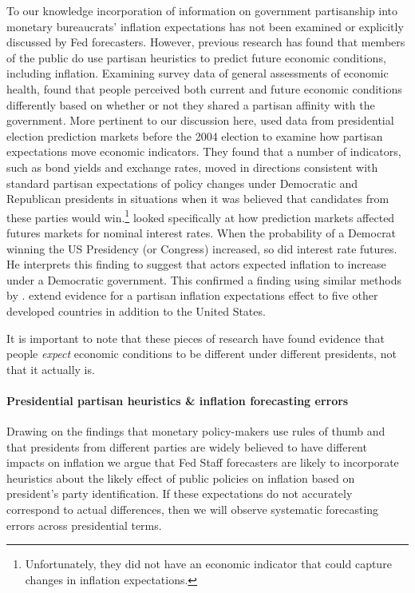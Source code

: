 \documentclass[a4paper]{article}\usepackage[]{graphicx}\usepackage[]{color}
\begin{document}
To our knowledge incorporation of information on government partisanship into monetary bureaucrats' inflation expectations has not been examined or explicitly discussed by Fed forecasters. However, previous research has found that members of the public do use partisan heuristics to predict future economic conditions, including inflation. Examining survey data of general assessments of economic health, \cite{Duch2000} found that people perceived both current and future economic conditions differently based on whether or not they shared a partisan affinity with the government. More pertinent to our discussion here, \cite{Snowberg2007} used data from presidential election prediction markets before the 2004 election to examine how partisan expectations move economic indicators. They found that a number of indicators, such as bond yields and exchange rates, moved in directions consistent with standard partisan expectations of policy changes under Democratic and Republican presidents in situations when it was believed that candidates from these parties would win.\footnote{Unfortunately, they did not have an economic indicator that could capture changes in inflation expectations.} \cite{Fowler2006} looked specifically at how prediction markets affected futures markets for nominal interest rates. When the probability of a Democrat winning the US Presidency (or Congress) increased, so did interest rate futures. He interprets this finding to suggest that actors expected inflation to increase under a Democratic government. This confirmed a finding using similar methods by \cite{Alesina1997}. \cite{Berlemann2006} extend evidence for a partisan inflation expectations effect to five other developed countries in addition to the United States.

It is important to  note that these pieces of research have found evidence that people {\emph{expect}} economic conditions to be different under different presidents, not that it actually is.

\paragraph{Presidential partisan heuristics \& inflation forecasting errors}

Drawing on the findings that monetary policy-makers use rules of thumb and that presidents from different parties are widely believed to have different impacts on inflation we argue that Fed Staff forecasters are likely to incorporate heuristics about the likely effect of public policies on inflation based on president's party identification. If these expectations do not accurately correspond to actual differences, then we will observe systematic forecasting errors across presidential terms.  
\end{document}
